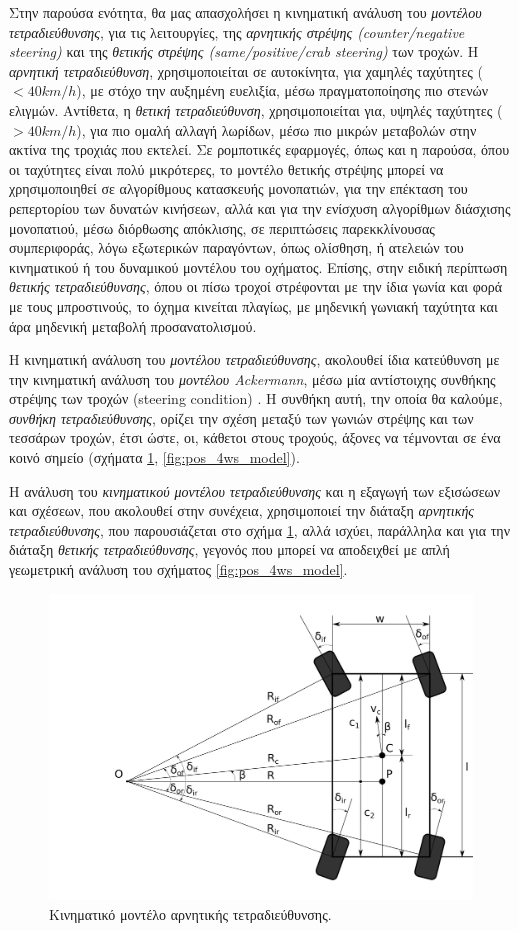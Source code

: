 \bigskip
Στην παρούσα ενότητα, θα μας απασχολήσει η κινηματική ανάλυση του \textit{μοντέλου τετραδιεύθυνσης}, για τις λειτουργίες, της \textit{αρνητικής στρέψης (counter/negative steering)} και της \textit{θετικής στρέψης (same/positive/crab steering)} των τροχών. Η \textit{αρνητική τετραδιεύθυνση}, χρησιμοποιείται σε αυτοκίνητα, για χαμηλές ταχύτητες ($< 40 km/h$), με στόχο την αυξημένη ευελιξία, μέσω πραγματοποίησης πιο στενών ελιγμών. Αντίθετα, η \textit{θετική τετραδιεύθυνση}, χρησιμοποιείται για, υψηλές ταχύτητες ($> 40 km/h$), για πιο ομαλή αλλαγή λωρίδων, μέσω πιο μικρών μεταβολών στην ακτίνα της τροχιάς που εκτελεί. Σε ρομποτικές εφαρμογές, όπως και η παρούσα, όπου οι ταχύτητες είναι πολύ μικρότερες, το μοντέλο θετικής στρέψης μπορεί να χρησιμοποιηθεί σε αλγορίθμους κατασκευής μονοπατιών, για την επέκταση του ρεπερτορίου των δυνατών κινήσεων, αλλά και για την ενίσχυση αλγορίθμων διάσχισης μονοπατιού, μέσω διόρθωσης απόκλισης, σε περιπτώσεις παρεκκλίνουσας συμπεριφοράς, λόγω εξωτερικών παραγόντων, όπως ολίσθηση, ή ατελειών του κινηματικού ή του δυναμικού μοντέλου του οχήματος. Επίσης, στην ειδική περίπτωση \textit{θετικής τετραδιεύθυνσης}, όπου οι πίσω τροχοί στρέφονται με την ίδια γωνία και φορά με τους μπροστινούς, το όχημα κινείται πλαγίως, με μηδενική γωνιακή ταχύτητα και άρα μηδενική μεταβολή προσανατολισμού.


\bigskip
Η κινηματική ανάλυση του \textit{μοντέλου τετραδιεύθυνσης}, ακολουθεί ίδια κατεύθυνση με την κινηματική ανάλυση του \textit{μοντέλου Ackermann}, μέσω μία αντίστοιχης συνθήκης στρέψης των τροχών (steering condition) \cite{vehicle_dynamics}. Η συνθήκη αυτή, την οποία θα καλούμε, \textit{συνθήκη τετραδιεύθυνσης}, ορίζει την σχέση μεταξύ των γωνιών στρέψης και των τεσσάρων τροχών, έτσι ώστε, οι, κάθετοι στους τροχούς, άξονες να τέμνονται σε ένα κοινό σημείο (σχήματα \ref{fig:4ws_model}, \ref{fig:pos_4ws_model}). 

\bigskip
Η ανάλυση του \textit{κινηματικού μοντέλου τετραδιεύθυνσης} και η εξαγωγή των εξισώσεων και σχέσεων, που ακολουθεί στην συνέχεια, χρησιμοποιεί την διάταξη \textit{αρνητικής τετραδιεύθυνσης}, που παρουσιάζεται στο σχήμα \ref{fig:4ws_model}, αλλά ισχύει, παράλληλα και για την διάταξη \textit{θετικής τετραδιεύθυνσης}, γεγονός που μπορεί να αποδειχθεί με απλή γεωμετρική ανάλυση του σχήματος \ref{fig:pos_4ws_model}.

\begin{figure}[!ht]
	\centering
	\includegraphics[width=0.7\linewidth]{Chapters/Chapter2/Figures/4ws_model.png}
	\caption{Κινηματικό μοντέλο αρνητικής τετραδιεύθυνσης.}
	\label{fig:4ws_model}
\end{figure}


